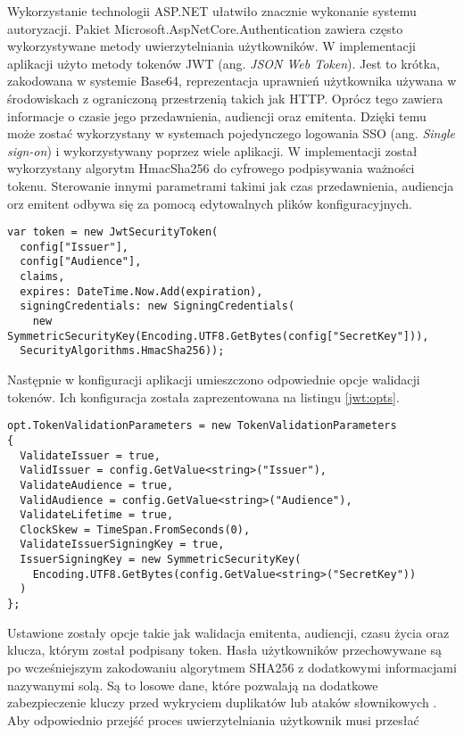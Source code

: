Wykorzystanie technologii ASP.NET ułatwiło znacznie wykonanie systemu autoryzacji. 
Pakiet Microsoft.AspNetCore.Authentication zawiera często wykorzystywane metody
uwierzytelniania użytkowników. W implementacji aplikacji użyto metody tokenów JWT
(ang. \textit{JSON Web Token}). Jest to krótka, zakodowana w systemie Base64, 
reprezentacja uprawnień użytkownika używana w środowiskach z ograniczoną przestrzenią 
takich jak HTTP\cite{jwt:rfc7519}. Oprócz tego zawiera informacje o
czasie jego przedawnienia, audiencji oraz emitenta. Dzięki temu
może zostać wykorzystany w systemach pojedynczego logowania
SSO (ang. \textit{Single sign-on}) i wykorzystywany poprzez wiele aplikacji.
W implementacji został wykorzystany algorytm HmacSha256 do cyfrowego
podpisywania ważności tokenu. Sterowanie innymi parametrami takimi jak czas
przedawnienia, audiencja orz emitent odbywa się za pomocą edytowalnych
plików konfiguracyjnych.
\begin{lstlisting}[language={[Sharp]C},caption={Tworzenie tokenu JWT},label={jwt:create},captionpos=b]
var token = new JwtSecurityToken(
  config["Issuer"],
  config["Audience"],
  claims,
  expires: DateTime.Now.Add(expiration),
  signingCredentials: new SigningCredentials(
    new SymmetricSecurityKey(Encoding.UTF8.GetBytes(config["SecretKey"])),
  SecurityAlgorithms.HmacSha256));
\end{lstlisting} 
Następnie w konfiguracji aplikacji umieszczono odpowiednie opcje walidacji tokenów.
Ich konfiguracja została zaprezentowana na listingu \ref{jwt:opts}.
\begin{lstlisting}[language={[Sharp]C},caption={Opcje walidacji JWT},label={jwt:opts},captionpos=b]
opt.TokenValidationParameters = new TokenValidationParameters
{
  ValidateIssuer = true,
  ValidIssuer = config.GetValue<string>("Issuer"),
  ValidateAudience = true,
  ValidAudience = config.GetValue<string>("Audience"),
  ValidateLifetime = true,
  ClockSkew = TimeSpan.FromSeconds(0),
  ValidateIssuerSigningKey = true,
  IssuerSigningKey = new SymmetricSecurityKey(
    Encoding.UTF8.GetBytes(config.GetValue<string>("SecretKey"))
  )
};
\end{lstlisting} 
Ustawione zostały opcje takie jak walidacja emitenta, audiencji, czasu życia oraz
klucza, którym został podpisany token.
Hasła użytkowników przechowywane są po wcześniejszym zakodowaniu algorytmem SHA256
z dodatkowymi informacjami nazywanymi solą. Są to losowe dane, które pozwalają na
dodatkowe zabezpieczenie kluczy przed wykryciem duplikatów lub ataków słownikowych
\cite{anderson2020security}.
Aby odpowiednio przejść proces uwierzytelniania użytkownik musi przesłać
